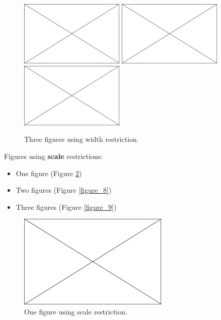 \begin{figure}[H] %
	\begin{center}
		\includegraphics[width=5cm]{Figures/Chapter_1/placeholder} \includegraphics[width=5cm]{Figures/Chapter_1/placeholder} \includegraphics[width=5cm]{Figures/Chapter_1/placeholder} \caption{
			\label{figure_6} Three figures using width restriction.}
		\vspace{-0.5cm}
	\end{center}
\end{figure}

Figures using \textbf{scale} restrictions:
\begin{itemize}
	\item One figure (Figure \ref{figure_7})
	\item Two figures (Figure \ref{figure_8})
	\item Three figures (Figure \ref{figure_9})
\end{itemize}

\begin{figure}[H] %
	\begin{center}
		\includegraphics[keepaspectratio=true, scale = 0.75]{Figures/Chapter_1/placeholder} \caption{
			\label{figure_7} One figure using scale restriction.}
		\vspace{-0.5cm}
	\end{center}
\end{figure}

